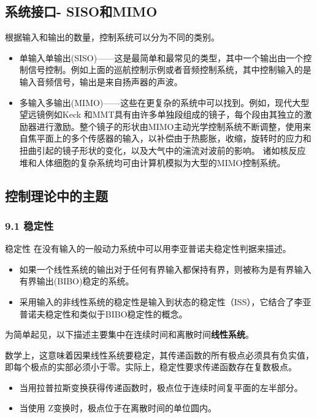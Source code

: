 \subsection{系统接口- SISO和MIMO}

根据输入和输出的数量，控制系统可以分为不同的类别。

\begin{itemize}
\item 单输入单输出(SISO)——这是最简单和最常见的类型，其中一个输出由一个控制信号控制。例如上面的巡航控制示例或者音频控制系统，其中控制输入的是输入音频信号，输出是来自扬声器的声波。
\item 多输入多输出(MIMO)——这些在更复杂的系统中可以找到。例如，现代大型望远镜例如Keck 和MMT具有由许多单独段组成的镜子，每个段由其独立的激励器进行激励。整个镜子的形状由MIMO主动光学控制系统不断调整，使用来自焦平面上的多个传感器的输入，以补偿由于热膨胀，收缩，旋转时的应力和扭曲引起的镜子形状的变化，以及大气中的湍流对波前的影响。 诸如核反应堆和人体细胞的复杂系统均可由计算机模拟为大型的MIMO控制系统。
\end{itemize}

\subsection{控制理论中的主题}

\subsubsection{9.1 稳定性}

稳定性 在没有输入的一般动力系统中可以用李亚普诺夫稳定性判据来描述。

\begin{itemize}
\item 如果一个线性系统的输出对于任何有界输入都保持有界，则被称为是有界输入有界输出(BIBO)稳定的系统。
\item 采用输入的非线性系统的稳定性是输入到状态的稳定性（ISS），它结合了李亚普诺夫稳定性和类似于BIBO稳定性的概念。
\end{itemize}

为简单起见，以下描述主要集中在连续时间和离散时间\textbf{线性系统}。

数学上，这意味着因果线性系统要稳定，其传递函数的所有极点必须具有负实值，即每个极点的实部必须小于零。实际上，稳定性要求传递函数存在复数极点。

\begin{itemize}
\item 当用拉普拉斯变换获得传递函数时，极点位于连续时间复平面的左半部分。
\item 当使用 Z变换时，极点位于在离散时间的单位圆内。
\end{itemize}

